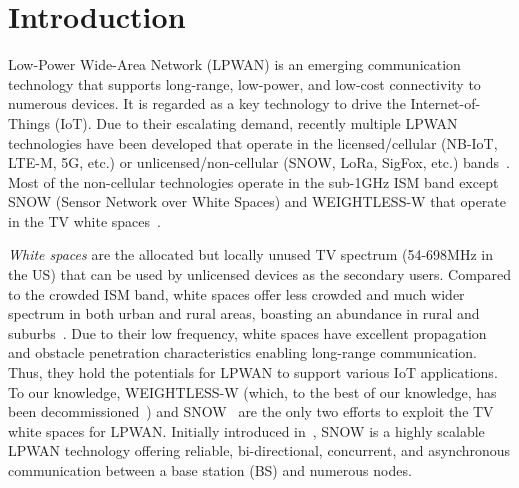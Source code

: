 \section{Introduction}\label{sec:intro}

Low-Power Wide-Area Network (LPWAN) is an emerging communication technology that supports long-range, low-power, and low-cost connectivity to numerous devices. It is regarded as a key technology to drive the Internet-of-Things (IoT). Due to their escalating demand, recently multiple LPWAN technologies have been developed that operate in the licensed/cellular (NB-IoT, LTE-M, 5G, etc.) or unlicensed/non-cellular (SNOW, LoRa, SigFox, etc.) bands~\cite{ismail2018low}. Most of the non-cellular technologies operate in the sub-1GHz ISM band except SNOW (Sensor Network over White Spaces) and WEIGHTLESS-W that operate in the TV white spaces~\cite{ismail2018low, whitespaceSurvey}.

\emph{White spaces} are the allocated but locally unused TV spectrum (54-698MHz in the US) that can be used by unlicensed devices as the secondary users.
Compared to the crowded ISM band, white spaces offer less crowded and much wider spectrum in both urban and rural areas, boasting an abundance in rural and suburbs~\cite{snow2}. Due to their low frequency, white spaces have excellent propagation and obstacle penetration characteristics enabling long-range communication. Thus, they hold the potentials for LPWAN to support various IoT applications. 
To our knowledge, WEIGHTLESS-W (which, to the best of our knowledge, has been decommissioned~\cite{ismail2018low}) and SNOW~\cite{snow_ton} are the only two efforts to exploit the TV white spaces for LPWAN. 
Initially introduced in~\cite{snow}, SNOW is a highly scalable LPWAN technology offering reliable, bi-directional, concurrent, and asynchronous communication between a base station (BS) and numerous nodes.


